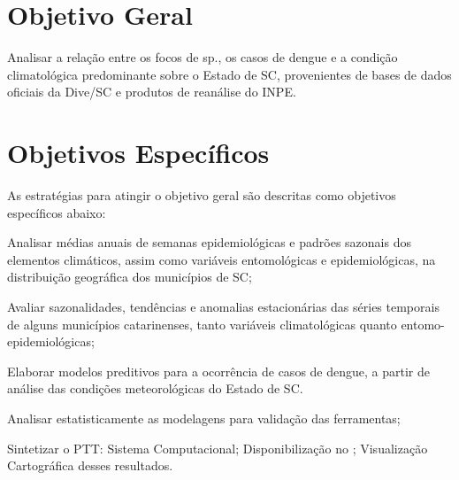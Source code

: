  \section{Objetivo Geral}
 Analisar a relação entre os focos de  sp., os casos de dengue e a condição climatológica predominante sobre o Estado de \acrlong{SC}, provenientes de bases de dados oficiais da \acrlong{Dive}/\acrshort{SC} e produtos de reanálise do \acrlong{INPE}.





 
\section{Objetivos Específicos}
As estratégias para atingir o objetivo geral são descritas como objetivos específicos abaixo:

\begin{alineas}
\item Analisar médias anuais de semanas epidemiológicas e padrões sazonais dos elementos climáticos, assim como variáveis entomológicas e epidemiológicas, na distribuição geográfica dos municípios de \acrlong{SC};
\item Avaliar sazonalidades, tendências e anomalias estacionárias das séries temporais de alguns municípios catarinenses, tanto  variáveis climatológicas quanto entomo-epidemiológicas;
\item Elaborar modelos preditivos para a ocorrência de casos de dengue, a partir de análise das condições meteorológicas do Estado de \acrlong{SC}.
\item Analisar estatisticamente as modelagens para validação das ferramentas;
\item Sintetizar o \acrfull{PTT}:
\subitem Sistema Computacional;
\subitem Disponibilização  no ;
\subitem Visualização Cartográfica desses resultados.
\end{alineas}
